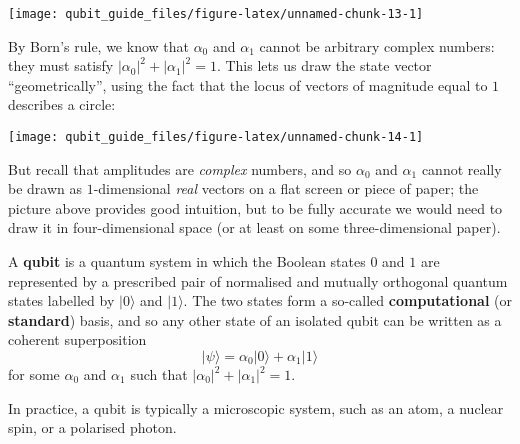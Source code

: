 \documentclass[fleqn]{article}
\newenvironment{idea}{\noindent}{\medskip}
\begin{document}
\begin{center}\texttt{[image: qubit\_guide\_files/figure-latex/unnamed-chunk-13-1]} \end{center}

By Born's rule, we know that \(\alpha_0\) and \(\alpha_1\) cannot be arbitrary complex numbers: they must satisfy \(|\alpha_0|^2+|\alpha_1|^2=1\).
This lets us draw the state vector ``geometrically'', using the fact that the locus of vectors of magnitude equal to \(1\) describes a circle:

\begin{center}\texttt{[image: qubit\_guide\_files/figure-latex/unnamed-chunk-14-1]} \end{center}

But recall that amplitudes are \emph{complex} numbers, and so \(\alpha_0\) and \(\alpha_1\) cannot really be drawn as \(1\)-dimensional \emph{real} vectors on a flat screen or piece of paper;
the picture above provides good intuition, but to be fully accurate we would need to draw it in four-dimensional space (or at least on some three-dimensional paper).

\begin{idea}
A \textbf{qubit} is a quantum system in which the Boolean states \(0\) and \(1\) are represented by a prescribed pair of normalised and mutually orthogonal quantum states labelled by \(|0\rangle\) and \(|1\rangle\).
The two states form a so-called \textbf{computational} (or \textbf{standard}) basis, and so any other state of an isolated qubit can be written as a coherent superposition
\[
  |\psi\rangle = \alpha_0|0\rangle + \alpha_1|1\rangle
\]
for some \(\alpha_0\) and \(\alpha_1\) such that \(|\alpha_0|^2 + |\alpha_1|^2 = 1\).

In practice, a qubit is typically a microscopic system, such as an atom, a nuclear spin, or a polarised photon.

\end{idea}
\end{document}
